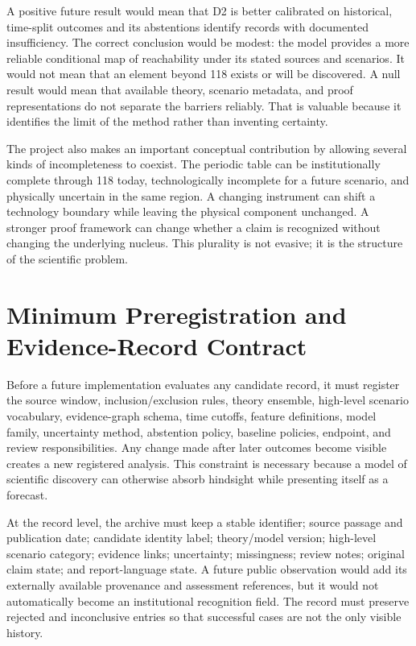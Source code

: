 \documentclass[conference]{IEEEtran}
\begin{document}
A positive future result would mean that D2 is better calibrated on historical, time-split outcomes and its abstentions identify records with documented insufficiency. The correct conclusion would be modest: the model provides a more reliable conditional map of reachability under its stated sources and scenarios. It would not mean that an element beyond 118 exists or will be discovered. A null result would mean that available theory, scenario metadata, and proof representations do not separate the barriers reliably. That is valuable because it identifies the limit of the method rather than inventing certainty.

The project also makes an important conceptual contribution by allowing several kinds of incompleteness to coexist. The periodic table can be institutionally complete through 118 today, technologically incomplete for a future scenario, and physically uncertain in the same region. A changing instrument can shift a technology boundary while leaving the physical component unchanged. A stronger proof framework can change whether a claim is recognized without changing the underlying nucleus. This plurality is not evasive; it is the structure of the scientific problem.

\section{Minimum Preregistration and Evidence-Record Contract}

Before a future implementation evaluates any candidate record, it must register the source window, inclusion/exclusion rules, theory ensemble, high-level scenario vocabulary, evidence-graph schema, time cutoffs, feature definitions, model family, uncertainty method, abstention policy, baseline policies, endpoint, and review responsibilities. Any change made after later outcomes become visible creates a new registered analysis. This constraint is necessary because a model of scientific discovery can otherwise absorb hindsight while presenting itself as a forecast.

At the record level, the archive must keep a stable identifier; source passage and publication date; candidate identity label; theory/model version; high-level scenario category; evidence links; uncertainty; missingness; review notes; original claim state; and report-language state. A future public observation would add its externally available provenance and assessment references, but it would not automatically become an institutional recognition field. The record must preserve rejected and inconclusive entries so that successful cases are not the only visible history.
\end{document}
